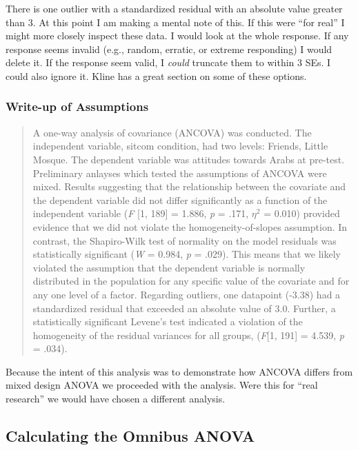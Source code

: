 \documentclass[
  11pt,
]{book}
\begin{document}
There is one outlier with a standardized residual with an absolute value greater than 3. At this point I am making a mental note of this. If this were ``for real'' I might more closely inspect these data. I would look at the whole response. If any response seems invalid (e.g., random, erratic, or extreme responding) I would delete it. If the response seem valid, I \emph{could} truncate them to within 3 SEs. I could also ignore it. Kline \citeyearpar{kline_principles_2016} has a great section on some of these options.

\hypertarget{write-up-of-assumptions-1}{%
\subsubsection{Write-up of Assumptions}\label{write-up-of-assumptions-1}}

\begin{quote}
A one-way analysis of covariance (ANCOVA) was conducted. The independent variable, sitcom condition, had two levels: Friends, Little Mosque. The dependent variable was attitudes towards Arabs at pre-test. Preliminary anlayses which tested the assumptions of ANCOVA were mixed. Results suggesting that the relationship between the covariate and the dependent variable did not differ significantly as a function of the independent variable (\emph{F} {[}1, 189{]} = 1.886, \emph{p} = .171, \(\eta^2\) = 0.010) provided evidence that we did not violate the homogeneity-of-slopes assumption. In contrast, the Shapiro-Wilk test of normality on the model residuals was statistically significant (\emph{W} = 0.984, \emph{p} = .029). This means that we likely violated the assumption that the dependent variable is normally distributed in the population for any specific value of the covariate and for any one level of a factor. Regarding outliers, one datapoint (-3.38) had a standardized residual that exceeded an absolute value of 3.0. Further, a statistically significant Levene's test indicated a violation of the homogeneity of the residual variances for all groups, (\emph{F}{[}1, 191{]} = 4.539, \emph{p} = .034).
\end{quote}

Because the intent of this analysis was to demonstrate how ANCOVA differs from mixed design ANOVA we proceeded with the analysis. Were this for ``real research'' we would have chosen a different analysis.

\hypertarget{calculating-the-omnibus-anova-1}{%
\subsection{Calculating the Omnibus ANOVA}\label{calculating-the-omnibus-anova-1}}
\end{document}
